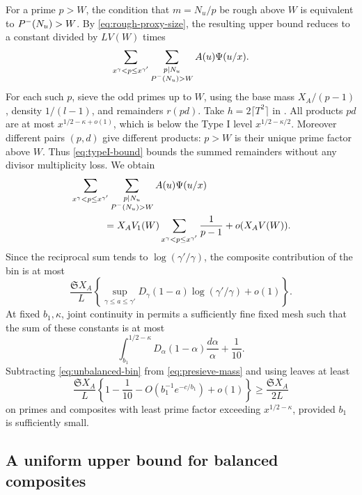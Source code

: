 For a prime $p>W$, the condition that $m=N_u/p$ be rough above
$W$ is equivalent to $P^{-}(N_u)>W$. By
\eqref{eq:rough-proxy-size}, the resulting upper bound reduces
to a constant divided by $LV(W)$ times
\[
 \sum_{x^\gamma<p\le x^{\gamma'}}
       \sum_{\substack{p\mid N_u\\P^{-}(N_u)>W}}
                     A(u)\Psi(u/x).
\]
For each such $p$, sieve the odd primes up to $W$, using the base
mass $X_A/(p-1)$, density $1/(l-1)$, and remainders $r(pd)$.
Take $h=2\lceil T^2\rceil$ in . All products
$pd$ are at most $x^{1/2-\kappa+o(1)}$, which is below the
Type I level $x^{1/2-\kappa/2}$. Moreover different pairs $(p,d)$
give different products: $p>W$ is their unique prime factor above
$W$. Thus \eqref{eq:typeI-bound} bounds the summed remainders
without any divisor multiplicity loss. We obtain
\begin{align*}
 &\sum_{x^\gamma<p\le x^{\gamma'}}
       \sum_{\substack{p\mid N_u\\\Pminus(N_u)>W}}
                  A(u)\Psi(u/x)\\
 &\hspace{12mm}=X_AV_1(W)
          \sum_{x^\gamma<p\le x^{\gamma'}}\frac1{p-1}
                   +o(X_AV(W)).
\end{align*}
Since the reciprocal sum tends to $\log(\gamma'/\gamma)$,
the composite contribution of the bin is at most
\begin{equation}\label{eq:unbalanced-bin}
 \frac{\mathfrak S X_A}{L}
 \left\{\sup_{\gamma\le a\le\gamma'}D_\gamma(1-a)
                    \log(\gamma'/\gamma)+o(1)\right\}.
\end{equation}
At fixed $b_1,\kappa$, joint continuity in
 permits a sufficiently fine fixed mesh
such that the sum of these constants is at most
\[
 \int_{b_1}^{1/2-\kappa}D_\alpha(1-\alpha)
                       \frac{d\alpha}{\alpha}+\frac1{10}.
\]
Subtracting \eqref{eq:unbalanced-bin} from
\eqref{eq:presieve-mass} and using
 leaves at least
\begin{equation}\label{eq:prime-balanced-mass}
 \frac{\mathfrak S X_A}{L}
      \left\{1-\frac1{10}
               -O(b_1^{-1}e^{-c/b_1})+o(1)\right\}
 \ge \frac{\mathfrak S X_A}{2L}
\end{equation}
on primes and composites with least prime factor exceeding
$x^{1/2-\kappa}$, provided $b_1$ is sufficiently small.

\subsection{A uniform upper bound for balanced composites}

